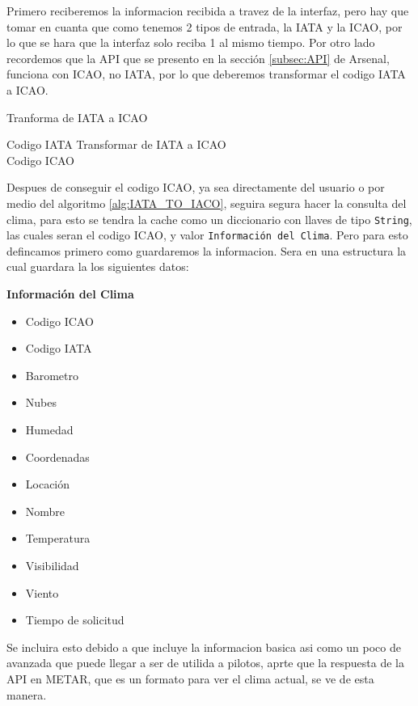 Primero reciberemos la informacion recibida a travez de la interfaz, pero hay que tomar en cuanta que como tenemos 2 tipos de entrada, 
la IATA y la ICAO, por lo que se hara que la interfaz solo reciba 1 al mismo tiempo. Por otro lado recordemos que la API que se presento
en la sección \ref{subsec:API} de Arsenal, funciona con ICAO, no IATA, por lo que deberemos transformar el codigo IATA a ICAO.

\begin{algorithm}
    \caption{Tranforma de IATA a ICAO}\label{alg:IATA_TO_IACO}
    \begin{algorithmic}
        \Require Codigo IATA
        \State Transformar de IATA a ICAO \\
        \Return Codigo ICAO
    \end{algorithmic}
\end{algorithm}

Despues de conseguir el codigo ICAO, ya sea directamente del usuario o por medio del algoritmo \ref{alg:IATA_TO_IACO},
seguira segura hacer la consulta del clima, para esto se tendra la cache como un diccionario con llaves de tipo \texttt{String},
las cuales seran el codigo ICAO, y valor \texttt{Información del Clima}. Pero para esto defincamos primero como guardaremos la informacion. 
Sera en una estructura la cual guardara la los siguientes datos:

\textbf{Información del Clima}
\begin{itemize}
    \label{strc:info}
    \item Codigo ICAO
    \item Codigo IATA
    \item Barometro
    \item Nubes
    \item Humedad
    \item Coordenadas
    \item Locación
    \item Nombre
    \item Temperatura
    \item Visibilidad
    \item Viento
    \item Tiempo de solicitud
\end{itemize}

Se incluira esto debido a que incluye la informacion basica asi como un poco de avanzada que puede llegar a ser de utilida a pilotos, aprte
que la respuesta de la API en METAR, que es un formato para ver el clima actual, se ve de esta manera.

